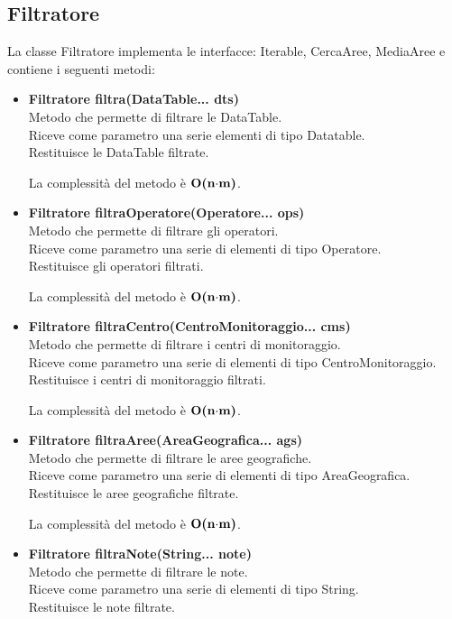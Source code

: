 \documentclass[a4paper, 12pt]{scrreprt}
\begin{document}
			\subsection{Filtratore}
			La classe Filtratore implementa le interfacce: Iterable, CercaAree, MediaAree e contiene i seguenti metodi:
			\begin{itemize}
				\item \textbf{Filtratore filtra(DataTable... dts)}
				\\Metodo che permette di filtrare le DataTable.
				\\Riceve come parametro una serie elementi di tipo Datatable.
				\\Restituisce le DataTable filtrate.
				
				La complessit\`a del metodo \`e $\mathbf{O}\textbf{(n$\cdot$m)}$.
				
				\item \textbf{Filtratore filtraOperatore(Operatore... ops)}
				\\Metodo che permette di filtrare gli operatori.
				\\Riceve come parametro una serie di elementi di tipo Operatore.
				\\Restituisce gli operatori filtrati.
				
				La complessit\`a del metodo \`e $\mathbf{O}\textbf{(n$\cdot$m)}$.
				
				\item \textbf{Filtratore filtraCentro(CentroMonitoraggio... cms)}
				\\Metodo che permette di filtrare i centri di monitoraggio.
				\\Riceve come parametro una serie di elementi di tipo CentroMonitoraggio.
				\\Restituisce i centri di monitoraggio filtrati.
				
				La complessit\`a del metodo \`e $\mathbf{O}\textbf{(n$\cdot$m)}$.
				
				\item \textbf{Filtratore filtraAree(AreaGeografica... ags)}
				\\Metodo che permette di filtrare le aree geografiche.
				\\Riceve come parametro una serie di elementi di tipo AreaGeografica.
				\\Restituisce le aree geografiche filtrate.
				
				La complessit\`a del metodo \`e $\mathbf{O}\textbf{(n$\cdot$m)}$.
				
				\item \textbf{Filtratore filtraNote(String... note)}
				\\Metodo che permette di filtrare le note.
				\\Riceve come parametro una serie di elementi di tipo String.
				\\Restituisce le note filtrate.
				

\end{itemize}
\end{document}
